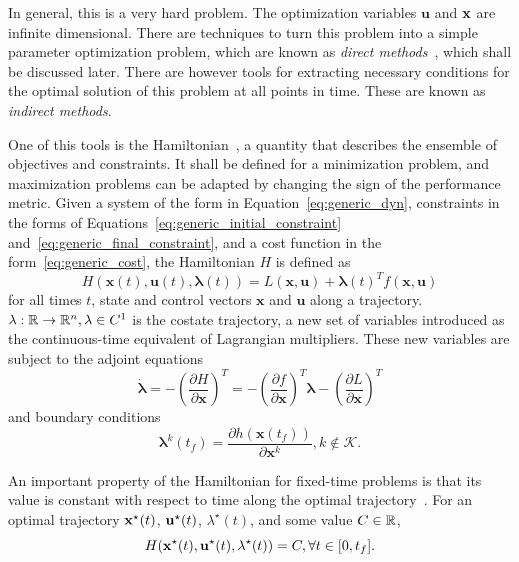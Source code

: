 In general, this is a very hard problem. The optimization variables \(\mathbf{u}\) and \(\mathbf{x}\) are infinite dimensional. There are techniques to turn this problem into a simple parameter optimization problem, which are known as \textit{direct methods}~\cite{Conway_2010}, which shall be discussed later. There are however tools for extracting necessary conditions for the optimal solution of this problem at all points in time. These are known as \textit{indirect methods}.

One of this tools is the Hamiltonian~\cite{Conway_2010}, a quantity that describes the ensemble of objectives and constraints. It shall be defined for a minimization problem, and maximization problems can be adapted by changing the sign of the performance metric. Given a system of the form in Equation~\eqref{eq:generic_dyn}, constraints in the forms of Equations~\eqref{eq:generic_initial_constraint} and~\eqref{eq:generic_final_constraint}, and a cost function in the form~\eqref{eq:generic_cost}, the Hamiltonian \(H\) is defined as~\cite{bertsekas}
\begin{equation}
    H(\mathbf{x}(t), \mathbf{u}(t), \mathbf{\lambda}(t)) = L(\mathbf{x}, \mathbf{u}) + \mathbf{\lambda}{(t)}^T f(\mathbf{x}, \mathbf{u})
\end{equation}
for all times \(t\), state and control vectors \(\mathbf{x}  \) and \(\mathbf{u}\) along a trajectory.\ \( \mathbf{\lambda}: \mathbb{R} \rightarrow \mathbb{R}^n, \mathbf{\lambda} \in C^1\) is the costate trajectory, a new set of variables introduced as the continuous-time equivalent of Lagrangian multipliers. These new variables are subject to the adjoint equations
\begin{equation}
    \dot{\mathbf{\lambda}} = - \left( \frac{\partial H}{\partial \mathbf{x}} \right)^T = -\left( \frac{\partial f}{\partial \mathbf{x}} \right)^T \mathbf{\lambda} - \left( \frac{\partial L}{\partial \mathbf{x}} \right)^T
\end{equation}
and boundary conditions~\cite{bryson_applied_optimal_control}
\begin{equation}\label{eq:final_costate}
    \mathbf{\lambda}^k(t_f) = \frac{\partial h(\mathbf{x}(t_f))}{\partial \mathbf{x}^k}, k \notin \mathcal{K}.
\end{equation}

An important property of the Hamiltonian for fixed-time problems is that its value is constant with respect to time along the optimal trajectory~\cite{bertsekas}. For an optimal trajectory \(\mathbf{x}^\star(t)\), \(\mathbf{u}^\star(t)\), \(\lambda^\star(t)\), and some value \(C \in \mathbb{R}\),
\begin{equation}\label{eq:constant_hamilt}
    H(\x^\star(t), \uc^\star(t), \lambda^\star(t)) = C, \forall t \in [0, t_f].
\end{equation}


